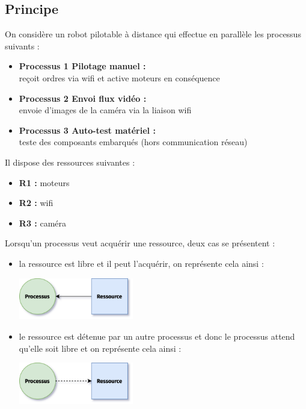 \documentclass[12pt,a4paper,article,english,firamath]{nsi}
\begin{document}
\maketitle




\subsection*{Principe}
On considère un robot pilotable à distance qui effectue en parallèle les processus suivants :
\begin{itemize}
	\item 	\textbf{Processus 1  Pilotage manuel : }\\ reçoit ordres via wifi et active moteurs en conséquence
	\item 	\textbf{Processus 2  Envoi flux vidéo : }\\ envoie d'images de la caméra via la liaison wifi
    \item 	\textbf{Processus 3  Auto-test matériel : }\\ teste des composants embarqués (hors communication réseau)
\end{itemize}
	

Il dispose des ressources suivantes :
\begin{itemize}
	\item 	\textbf{R1 : }  moteurs
	\item 	\textbf{R2 : }  wifi
    \item 	\textbf{R3 : }	caméra
\end{itemize}

Lorsqu'un processus veut acquérir une ressource, deux cas se présentent :
\begin{itemize}
	\item 	la ressource est libre et il peut l'acquérir, on représente cela ainsi :
			\begin{center}
			\includegraphics[width=5cm]{img/d1.png}
			\end{center}
	\item 	le ressource est détenue par un autre processus et donc le processus attend qu'elle soit libre et on représente cela ainsi :
	\begin{center}
			\includegraphics[width=5cm]{img/d2.png}
			\end{center}
\end{itemize}
\end{document}
